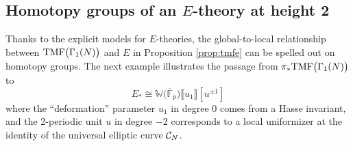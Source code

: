 \documentclass{gtpart}
\theoremstyle{definition}
\theoremstyle{remark}
\newcommand{\mb}[1]{\mathbb{#1}}
\newcommand{\cF}{\overline {\mb F}}
\newcommand{\CC}{{\cal C}}
\newcommand{\BW}{{\mb W}}
\newcommand{\TMF}{{\rm TMF}}
\newcommand{\G}{\Gamma}
\newcommand{\lb}{\llbracket}
\newcommand{\rb}{\rrbracket}
\renewcommand{\=}{\approx}
\renewcommand{\-}{\sim}
\numberwithin{equation}{section}
\begin{document}
\subsection{Homotopy groups of an $E$-theory at height 2}
\label{subsec:mfe0}

Thanks to the explicit models for $E$-theories, the global-to-local relationship 
between $\TMF\big(\G_1(N)\big)$ and $E$ in Proposition \ref{prop:tmfe} can be 
spelled out on homotopy groups.  The next example illustrates the passage from 
$\pi_* \TMF\big(\G_1(N)\big)$ to 
\[
 E_* \cong \BW \big( \cF_p \big) \lb u_1 \rb [u^{\pm 1}] 
\]
where the ``deformation'' parameter $u_1$ in degree 0 comes from a Hasse 
invariant, and the 2-periodic unit $u$ in degree $-2$ corresponds to a local 
uniformizer at the identity of the universal elliptic curve $\CC_N$.  
\end{document}
